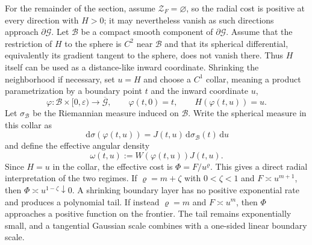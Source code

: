 \documentclass[11pt]{amsart}
\numberwithin{equation}{section}
\theoremstyle{definition}
\theoremstyle{remark}
\newcommand{\dd}{\,\mathrm{d}}
\newcommand{\eps}{\varepsilon}
\begin{document}
For the remainder of the section, assume $\mathcal Z_F=\varnothing$, so the
radial cost is positive at every direction with $H>0$; it may nevertheless
vanish as such directions approach $\partial\mathcal G$.  Let $\mathcal B$ be
a compact smooth component of $\partial\mathcal G$.  Assume that the
restriction of $H$ to the sphere is $C^2$ near $\mathcal B$ and that its
spherical differential, equivalently its gradient tangent to the sphere, does
not vanish there.  Thus $H$ itself can be used as a distance-like inward
coordinate.  Shrinking the neighborhood if necessary, set $u=H$ and choose a
$C^1$ collar, meaning a product parametrization by a boundary point $t$ and
the inward coordinate $u$,
\begin{equation}\label{eq:weibull-collar}
 \varphi:\mathcal B\times[0,\eps)\longrightarrow
 \overline{\mathcal G},
 \qquad
 \varphi(t,0)=t,
 \qquad
 H(\varphi(t,u))=u.
\end{equation}
Let $\sigma_{\mathcal B}$ be the Riemannian measure induced on
$\mathcal B$.  Write the spherical measure in this collar as
\begin{equation}\label{eq:weibull-collar-jacobian}
 \dd\sigma(\varphi(t,u))
 =J(t,u)\dd\sigma_{\mathcal B}(t)\dd u
\end{equation}
and define the effective angular density
\begin{equation}\label{eq:weibull-effective-density}
 \omega(t,u):=W(\varphi(t,u))J(t,u).
\end{equation}
Since $H=u$ in the collar, the effective cost is
$\Phi=F/u^\varrho$.  This gives a direct radial interpretation of the two
regimes.  If $\varrho=m+\zeta$ with $0<\zeta<1$ and
$F\asymp u^{m+1}$, then
$\Phi\asymp u^{1-\zeta}\downarrow0$.  A shrinking boundary layer has no
positive exponential rate and produces a polynomial tail.  If instead
$\varrho=m$ and $F\asymp u^m$, then $\Phi$ approaches a positive function on the
frontier.  The tail remains exponentially small, and a tangential Gaussian
scale combines with a one-sided linear boundary scale.
\end{document}
